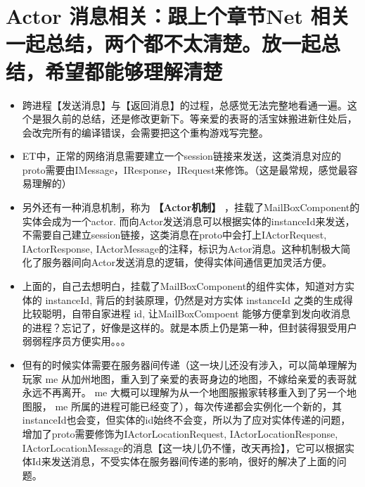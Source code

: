 \documentclass[9pt, b5paper]{article}
\begin{document}
\section{Actor 消息相关：跟上个章节Net 相关一起总结，两个都不太清楚。放一起总结，希望都能够理解清楚}
\label{sec-7}
\begin{itemize}
\item 跨进程【发送消息】与【返回消息】的过程，总感觉无法完整地看通一遍。这个是狠久前的总结，还是修改更新下。等亲爱的表哥的活宝妹搬进新住处后，会改完所有的编译错误，会需要把这个重构游戏写完整。
\item ET中，正常的网络消息需要建立一个session链接来发送，这类消息对应的proto需要由IMessage，IResponse，IRequest来修饰。（这是最常规，感觉最容易理解的）
\item 另外还有一种消息机制，称为 \textbf{【Actor机制】} ，挂载了MailBoxComponent的实体会成为一个actor. 而向Actor发送消息可以根据实体的instanceId来发送，不需要自己建立session链接，这类消息在proto中会打上IActorRequest, IActorResponse, IActorMessage的注释，标识为Actor消息。这种机制极大简化了服务器间向Actor发送消息的逻辑，使得实体间通信更加灵活方便。
\item 上面的，自己去想明白，挂载了MailBoxComponent的组件实体，知道对方实体的 instanceId, 背后的封装原理，仍然是对方实体 instanceId 之类的生成得比较聪明，自带自家进程 id, 让MailBoxCompoent 能够方便拿到发向收消息的进程？忘记了，好像是这样的。就是本质上仍是第一种，但封装得狠受用户弱弱程序员方便实用。。。
\item 但有的时候实体需要在服务器间传递（这一块儿还没有涉入，可以简单理解为玩家 me 从加州地图，重入到了亲爱的表哥身边的地图，不嫁给亲爱的表哥就永远不再离开。 me 大概可以理解为从一个地图服搬家转移重入到了另一个地图服， me 所属的进程可能已经变了），每次传递都会实例化一个新的，其instanceId也会变，但实体的id始终不会变，所以为了应对实体传递的问题，增加了proto需要修饰为IActorLocationRequest, IActorLocationResponse, IActorLocationMessage的消息【这一块儿仍不懂，改天再捡】，它可以根据实体Id来发送消息，不受实体在服务器间传递的影响，很好的解决了上面的问题。
\end{itemize}
\end{document}
